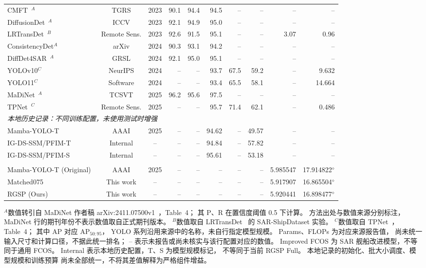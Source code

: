 \begin{table}[!t]
\begin{tabular*}{\textwidth}{@{\extracolsep{\fill}}lccrrrrrrr}
CMFT~\cite{cmft2023}$^{A}$
& TGRS & 2023
& 90.1 & 94.4 & 94.5 & -- & -- & -- & -- \\
DiffusionDet~\cite{diffusiondet2023}$^{A}$
& ICCV & 2023
& 92.1 & 94.9 & 95.0 & -- & -- & -- & -- \\
LRTransDet~\cite{lrtransdet2023}$^{B}$
& Remote Sens. & 2023
& 92.6 & 91.5 & 95.1 & -- & -- & 3.07 & 0.96 \\
ConsistencyDet$^{A}$
& arXiv & 2024
& 90.3 & 93.1 & 94.2 & -- & -- & -- & -- \\
DiffDet4SAR~\cite{diffdet4sar2024}$^{A}$
& GRSL & 2024
& 92.1 & 95.0 & 95.1 & -- & -- & -- & -- \\
YOLOv10$^{C}$
& NeurIPS & 2024
& -- & -- & 93.7 & 67.5 & 59.2 & -- & 9.632 \\
YOLO11$^{C}$
& Software & 2024
& -- & -- & 93.4 & 65.5 & 58.1 & -- & 14.664 \\
MaDiNet~\cite{madinet2025}$^{A}$
& TCSVT & 2025
& 96.2 & 95.6 & 97.5 & -- & -- & -- & -- \\
TPNet~\cite{tpnet2025}$^{C}$
& Remote Sens. & 2025
& -- & -- & 95.7 & 71.4 & 62.1 & -- & 0.486 \\
\midrule
\multicolumn{10}{l}{
\textit{本地历史记录：不同训练配置，未使用测试时增强}} \\
Mamba-YOLO-T~\cite{mambayolo2024}
& AAAI & 2025
& -- & -- & 94.62 & -- & 49.57 & -- & -- \\
IG-DS-SSM/PFIM-T
& Internal & --
& -- & -- & 94.84 & -- & 57.82 & -- & -- \\
IG-DS-SSM/PFIM-S
& Internal & --
& -- & -- & 95.61 & -- & 53.18 & -- & -- \\
\addlinespace
\multicolumn{10}{l}{\textit{新增配置复杂度：统一150轮上限协议，$31735/3970/3974$，训练结果待完成}} \\
Mamba-YOLO-T (Original)~\cite{mambayolo2024}
& AAAI & 2025
& -- & -- & -- & -- & --
& 5.985547 & 17.914822$^{\diamond}$ \\
Matched075
& This work & --
& -- & -- & -- & -- & --
& 5.917907 & 16.865504$^{\diamond}$ \\
RGSP (Ours)
& This work & --
& -- & -- & -- & -- & --
& 5.920441 & 16.898477$^{\diamond}$ \\
\bottomrule
\end{tabular*}
\smallskip
\begin{minipage}{\linewidth}
\footnotesize
$^{A}$数值转引自 MaDiNet 作者稿
arXiv:2411.07500v1~\cite{madinet_preprint}，Table~4；
其 P、R 在置信度阈值 0.5 下计算。
方法出处与数值来源分别标注，
MaDiNet 行的期刊年份不表示数值取自正式期刊版本。
$^{B}$数值取自 LRTransDet~\cite{lrtransdet2023}
的 SAR-ShipDataset 实验。
$^{C}$数值取自 TPNet~\cite{tpnet2025}，Table~4；
其中 AP 对应 AP$_{50:95}$，
YOLO 系列沿用来源中的名称，未自行指定模型规模。
Params、FLOPs 为对应来源报告值，
尚未统一输入尺寸和计算口径，不据此统一排名；
-- 表示未报告或尚未核实与该行配置对应的数值。
Improved FCOS 为 SAR 舰船改进模型，不等同于通用 FCOS。
Internal 表示本地历史配置，T、S 为模型规模标记，
不等同于当前 RGSP Full。
本地记录的初始化、批大小调度、模型规模和训练预算
尚未全部统一，不将其差值解释为严格组件增益。


\end{minipage}
\end{table}
